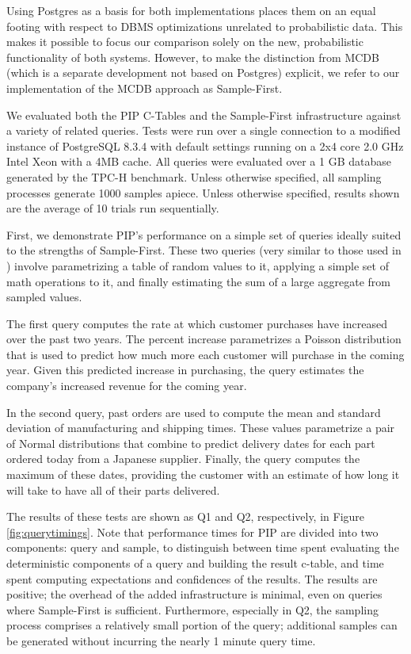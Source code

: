 Using Postgres as a basis for both implementations places them on an equal footing with respect to DBMS optimizations unrelated to probabilistic data.  This makes it possible to focus our comparison solely on the new, probabilistic functionality of both systems.  However, to make the distinction from MCDB (which is a separate development not based on Postgres) explicit, we refer to our implementation of the MCDB approach as Sample-First.

We evaluated both the PIP C-Tables and the Sample-First infrastructure against a variety of related queries.  Tests were run over a single connection to a modified instance of PostgreSQL 8.3.4 with default settings running on a 2x4 core 2.0 GHz Intel Xeon with a 4MB cache.  All queries were evaluated over a 1 GB database generated by the TPC-H benchmark.  Unless otherwise specified, all sampling processes generate 1000 samples apiece.  Unless otherwise specified, results shown are the average of 10 trials run sequentially.  



First, we demonstrate PIP's performance on a simple set of queries ideally suited to the strengths of Sample-First.  These two queries (very similar to those used in \cite{MCDB}) involve pa\-ra\-me\-tri\-zing a table of random values to it, applying a simple set of math operations to it, and finally estimating the sum of a large aggregate from sampled values.  

The first query computes the rate at which customer purchases have increased over the past two years.  The percent increase parametrizes a Poisson distribution that is used to predict how much more each customer will purchase in the coming year.  Given this predicted increase in purchasing, the query estimates the company's increased revenue for the coming year.

In the second query, past orders are used to compute the mean and standard deviation of manufacturing and shipping times.  These values parametrize a pair of Normal distributions that combine to predict delivery dates for each part ordered today from a Japanese supplier.  Finally, the query computes the maximum of these dates, providing the customer with an estimate of how long it will take to have all of their parts delivered.

The results of these tests are shown as Q1 and Q2, respectively, in Figure \ref{fig:querytimings}.  Note that performance times for PIP are divided into two components: query and sample, to distinguish between time spent evaluating the deterministic components of a query and building the result c-table, and time spent computing expectations and confidences of the results.  The results are positive; the overhead of the added infrastructure is minimal, even on queries where Sample-First is sufficient.  Furthermore, especially in Q2, the sampling process comprises a relatively small portion of the query; additional samples can be generated without incurring the nearly 1 minute query time.

